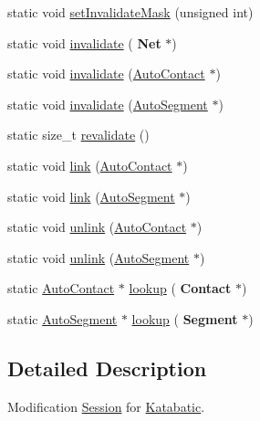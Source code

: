 \begin{DoxyCompactItemize}
\item 
static void \mbox{\hyperlink{classKatabatic_1_1Session_a16f4761496e07b9e836642d1effa1993}{set\+Invalidate\+Mask}} (unsigned int)
\item 
static void \mbox{\hyperlink{classKatabatic_1_1Session_ae310a7c2c301b7e5f90fba5d34cc5be9}{invalidate}} (\textbf{ Net} $\ast$)
\item 
static void \mbox{\hyperlink{classKatabatic_1_1Session_a1f8da0ae3a9d714c1dfae69904acec5f}{invalidate}} (\mbox{\hyperlink{classKatabatic_1_1AutoContact}{Auto\+Contact}} $\ast$)
\item 
static void \mbox{\hyperlink{classKatabatic_1_1Session_a7968875ccb5abb2c6f6d5dec92027550}{invalidate}} (\mbox{\hyperlink{classKatabatic_1_1AutoSegment}{Auto\+Segment}} $\ast$)
\item 
static size\+\_\+t \mbox{\hyperlink{classKatabatic_1_1Session_a4da9e28432c1fdb0c754717487d9cc83}{revalidate}} ()
\item 
static void \mbox{\hyperlink{classKatabatic_1_1Session_a8fad7191a9fc248f84e71cf1c9d0c6be}{link}} (\mbox{\hyperlink{classKatabatic_1_1AutoContact}{Auto\+Contact}} $\ast$)
\item 
static void \mbox{\hyperlink{classKatabatic_1_1Session_ab12ddab837097ec298ede4f66302b677}{link}} (\mbox{\hyperlink{classKatabatic_1_1AutoSegment}{Auto\+Segment}} $\ast$)
\item 
static void \mbox{\hyperlink{classKatabatic_1_1Session_a10c42636ea5786d898d530905ccb30d6}{unlink}} (\mbox{\hyperlink{classKatabatic_1_1AutoContact}{Auto\+Contact}} $\ast$)
\item 
static void \mbox{\hyperlink{classKatabatic_1_1Session_ab815a7824e0253142af6b8a204c361ec}{unlink}} (\mbox{\hyperlink{classKatabatic_1_1AutoSegment}{Auto\+Segment}} $\ast$)
\item 
static \mbox{\hyperlink{classKatabatic_1_1AutoContact}{Auto\+Contact}} $\ast$ \mbox{\hyperlink{classKatabatic_1_1Session_acc20c1f675cc59f9a0068aba727eca47}{lookup}} (\textbf{ Contact} $\ast$)
\item 
static \mbox{\hyperlink{classKatabatic_1_1AutoSegment}{Auto\+Segment}} $\ast$ \mbox{\hyperlink{classKatabatic_1_1Session_a6e465f0a592fee7e1e45b6c825b8a5da}{lookup}} (\textbf{ Segment} $\ast$)
\end{DoxyCompactItemize}


\subsection{Detailed Description}
Modification \mbox{\hyperlink{classKatabatic_1_1Session}{Session}} for \mbox{\hyperlink{namespaceKatabatic}{Katabatic}}. 

